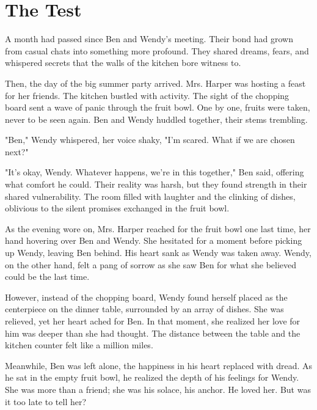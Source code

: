 \section{The Test}
A month had passed since Ben and Wendy's meeting. Their bond had grown from casual chats into something more profound. They shared dreams, fears, and whispered secrets that the walls of the kitchen bore witness to.

Then, the day of the big summer party arrived. Mrs. Harper was hosting a feast for her friends. The kitchen bustled with activity. The sight of the chopping board sent a wave of panic through the fruit bowl. One by one, fruits were taken, never to be seen again. Ben and Wendy huddled together, their stems trembling.

"Ben," Wendy whispered, her voice shaky, "I'm scared. What if we are chosen next?"

"It's okay, Wendy. Whatever happens, we're in this together," Ben said, offering what comfort he could. Their reality was harsh, but they found strength in their shared vulnerability. The room filled with laughter and the clinking of dishes, oblivious to the silent promises exchanged in the fruit bowl.

As the evening wore on, Mrs. Harper reached for the fruit bowl one last time, her hand hovering over Ben and Wendy. She hesitated for a moment before picking up Wendy, leaving Ben behind. His heart sank as Wendy was taken away. Wendy, on the other hand, felt a pang of sorrow as she saw Ben for what she believed could be the last time.

However, instead of the chopping board, Wendy found herself placed as the centerpiece on the dinner table, surrounded by an array of dishes. She was relieved, yet her heart ached for Ben. In that moment, she realized her love for him was deeper than she had thought. The distance between the table and the kitchen counter felt like a million miles.

Meanwhile, Ben was left alone, the happiness in his heart replaced with dread. As he sat in the empty fruit bowl, he realized the depth of his feelings for Wendy. She was more than a friend; she was his solace, his anchor. He loved her. But was it too late to tell her?
